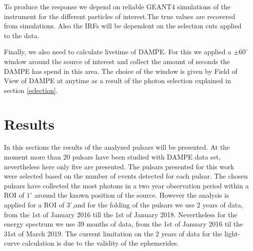 \documentclass{PoS}
\begin{document}
To produce the response we depend on reliable GEANT4 simulations of the instrument for the  different particles of interest.The true values are recovered from simulations. Also the IRFs will be dependent on the selection cuts applied to the data. 





Finally, we also need to calculate livetime of DAMPE. For this we applied a $ \pm 60^{\circ}$ window around the source of interest and collect the amount of seconds the DAMPE has spend in this area. The choice of the window is given by  Field of View of DAMPE at anytime as a result of the photon selection explained in section \ref{selection}.


\section{Results}
In this  sections  the  results of the analyzed pulsars will be presented. At the moment more than 20 pulsars have been  studied with DAMPE data set, nevertheless here only five are presented. The pulsars presented for this work were selected based on the number of events detected for each pulsar. The chosen pulsars have collected the most photons in a  two year observation period within a ROI of $1^\circ$ around the known position of the source. However the analysis is applied  for a ROI of $3^\circ$,and for the folding of the pulsars we use 2 years of data, from the 1st of January 2016 till the 1st of January 2018.  Nevertheless for the  energy spectrum we use 39 months of data, from the 1st of January 2016 til the  31st of March 2019. The current limitation on the 2 years of data for the  light-curve calculation is due to the validity of the ephemerides.
\end{document}
